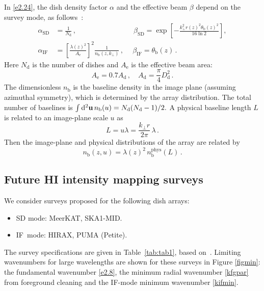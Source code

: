 In \eqref{e2.24}, the dish density factor $\alpha$ and the effective beam $\beta$ depend on the survey mode, as follows~\cite{Bull:2014rha, Obuljen:2017jiy, Ansari:2018ury, Jalilvand:2019bhk, Durrer:2020orn}:
\begin{align}
\alpha_\mathrm{SD} &= \frac{1}{N_\mathrm{d}}\,,\qquad\qquad\qquad\qquad  \beta_\mathrm{SD}= \exp\left[-\frac{k_\perp^2 r(z)^2\theta_{\mathrm b}(z)^2}{16\ln 2} \right], \label{sdn} \\
\alpha_\mathrm{IF} &=\left[ \frac{\lambda(z)^2}{A_{\mathrm e}}\right]^2 \frac{1}{n_{\mathrm b}(z,k_\perp)}
\,,\quad~  \beta_\mathrm{IF}= \theta_\mathrm{b}(z)\,. \label{ifn}
\end{align}
Here $N_\mathrm{d}$ is the number of dishes  and $A_\mathrm{e}$ is the effective beam area:
\begin{equation} \label{aeff}
A_\mathrm{e} = 0.7 A_\mathrm{d}\,, \quad A_\mathrm{d} = \frac{\pi}{4}D_\mathrm{d}^2\,.
\end{equation}
The dimensionless $n_\mathrm{b}$ is the baseline density in the image plane (assuming azimuthal symmetry), which is determined by the array distribution. {The total number of baselines is $\int \mathrm{d}^2{\textbf u}\,n_{\mathrm b}(u) = N_\mathrm{d}(N_\mathrm{d}-1)/2.$}
A physical baseline length $L$ is related to an image-plane scale $u$ as
\begin{equation}
L = u\lambda = \frac{k_\perp r}{ 2\pi}\,\lambda\,.
\end{equation}
Then the image-plane and physical distributions of the array are related by~\cite{Ansari:2018ury}
\begin{equation} \label{nbphy}
n_\mathrm{b}(z,u) = \lambda(z)^2\, n_\mathrm{b}^\mathrm{phys}(L)\,.
\end{equation}
%
%
\subsection{Future HI intensity mapping surveys}
%
We consider surveys proposed for the following dish arrays:
\begin{itemize}
\item 
SD mode:  MeerKAT, 
SKA1-MID.
\item
IF\ mode: HIRAX,
PUMA (Petite). 
\end{itemize}
The survey specifications are given in Table~\ref{tab:tab1}, {based on~\cite{Santos:2017qgq, Bacon:2018dui, Slosar:2019jwd,Karagiannis:2019jjx,Castorina:2020zhz}}. {Limiting wavenumbers for large wavelengths  are shown for these surveys in Figure \ref{figmin}: the
fundamental wavenumber \eqref{e2.8}, the minimum radial wavenumber \eqref{kfgpar} from foreground cleaning and the IF-mode minimum wavenumber \eqref{kifmin}.}


